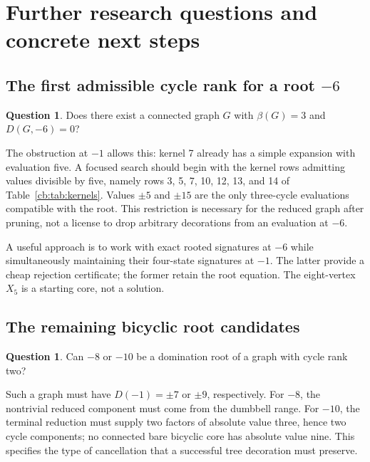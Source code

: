 \documentclass[11pt]{article}
\numberwithin{equation}{section}
\theoremstyle{definition}
\newtheorem{question}[theorem]{Question}
\begin{document}
\section{Further research questions and concrete next steps}\label{cb:sec:questions}

\subsection{The first admissible cycle rank for a root \texorpdfstring{$-6$}{minus six}}
\begin{question}\label{cb:q:minus6}
Does there exist a connected graph $G$ with $\beta(G)=3$ and $D(G,-6)=0$?
\end{question}
The obstruction at $-1$ allows this: kernel 7 already has a simple
expansion with evaluation five. A focused search should begin with the
kernel rows admitting values divisible by five, namely rows 3, 5, 7,
10, 12, 13, and 14 of Table~\ref{cb:tab:kernels}. Values $\pm5$ and $\pm15$
are the only three-cycle evaluations compatible with the root. This
restriction is necessary for the reduced graph after pruning, not a
license to drop arbitrary decorations from an evaluation at $-6$.

A useful approach is to work with exact rooted signatures at $-6$ while
simultaneously maintaining their four-state signatures at $-1$. The latter
provide a cheap rejection certificate; the former retain the root equation.
The eight-vertex $X_5$ is a starting core, not a solution.

\subsection{The remaining bicyclic root candidates}
\begin{question}\label{cb:q:bicyclic}
Can $-8$ or $-10$ be a domination root of a graph with cycle rank two?
\end{question}
Such a graph must have $D(-1)=\pm7$ or $\pm9$, respectively. For $-8$,
the nontrivial reduced component must come from the dumbbell range. For
$-10$, the terminal reduction must supply two factors of absolute value
three, hence two cycle components; no connected bare bicyclic core has
absolute value nine. This specifies the type of cancellation that a
successful tree decoration must preserve.
\end{document}
